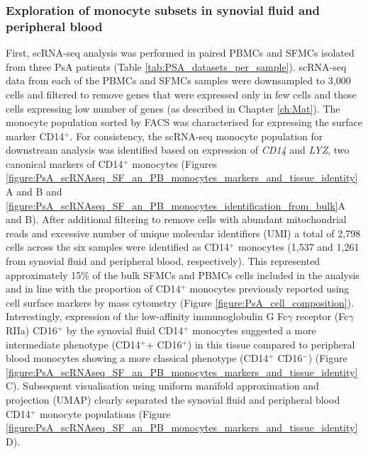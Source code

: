 \subsubsection{Exploration of monocyte subsets in synovial fluid and peripheral blood}
First, scRNA-seq analysis was performed in paired PBMCs and SFMCs isolated from three PsA patients (Table \ref{tab:PSA_datasets_per_sample}). scRNA-seq data from each of the PBMCs and SFMCs samples were downsampled to 3,000 cells and filtered to remove genes that were expressed only in few cells and those cells expressing low number of genes (as described in Chapter \ref{ch:Mat}). The monocyte population sorted by FACS was characterised for expressing the surface marker CD14$^+$. For consistency, the scRNA-seq monocyte population for downstream analysis was identified based on expression of \textit{CD14} and \textit{LYZ}, two canonical markers of CD14$^+$ monocytes \parencite{Zhao2009}(Figures \ref{figure:PsA_scRNAseq_SF_an_PB_monocytes_markers_and_tissue_identity}A and B and \ref{figure:PsA_scRNAseq_SF_an_PB_monocytes_identification_from_bulk}A and B). After additional filtering to remove cells with abundant mitochondrial reads and excessive number of unique molecular identifiers (UMI) a total of 2,798 cells across the six samples were identified as CD14$^+$ monocytes (1,537 and 1,261 from synovial fluid and peripheral blood, respectively). This represented approximately 15\% of the bulk SFMCs and PBMCs cells included in the analysis and in line with the proportion of CD14$^+$ monocytes previously reported using cell surface markers by mass cytometry (Figure \ref{figure:PsA_cell_composition}). Interestingly, expression of the low-affinity immunoglobulin G Fc$\gamma$ receptor (Fc$\gamma$RIIa) CD16$^+$ by the synovial fluid CD14$^+$ monocytes suggested a more intermediate phenotype (CD14$^+$+ CD16$^+$) in this tissue compared to peripheral blood monocytes showing a more classical phenotype (CD14$^+$ CD16$^-$) (Figure \ref{figure:PsA_scRNAseq_SF_an_PB_monocytes_markers_and_tissue_identity}C). Subsequent visualisation using uniform manifold approximation and projection (UMAP) clearly separated the synovial fluid and peripheral blood CD14$^+$ monocyte populations (Figure \ref{figure:PsA_scRNAseq_SF_an_PB_monocytes_markers_and_tissue_identity}D). 


